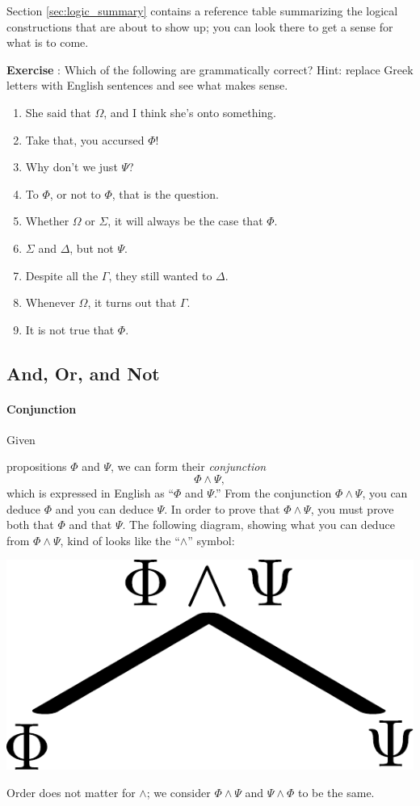 \documentclass[12pt]{article}
\newcommand{\AND}{\wedge}
\newcounter{exercise}
\def\putExerciseHeading{\refstepcounter{exercise} \textbf{Exercise \theexercise}}
\newcommand{\ex}[1]{ \putExerciseHeading: #1}
\def\pA{\Phi}
\def\pB{\Psi}
\def\pC{\Omega}
\def\pD{\Sigma}
\def\pE{\Gamma}
\def\pF{\Delta}
\begin{document}
Section \ref{sec:logic_summary}
contains a reference table summarizing the logical constructions that are about to show up;
you can look there to get a sense for what is to come.

\ex{
Which of the following are grammatically correct? Hint: replace Greek letters with English sentences and see what makes sense.
\begin{enumerate}
\item She said that $\pC$, and I think she's onto something.
\item Take that, you accursed $\pA$!
\item Why don't we just $\pB$?
\item To $\pA$, or not to $\pA$, that is the question.
\item Whether $\pC$ or $\pD$, it will always be the case that $\pA$.
\item $\pD$ and $\pF$, but not $\pB$.
\item Despite all the $\pE$, they still wanted to $\pF$.
\item Whenever $\pC$, it turns out that $\pE$.
\item It is not true that $\pA$.
\end{enumerate}
}



\subsection{And, Or, and Not}

\paragraph{Conjunction}
\hypertarget{hl:AND}{Given} propositions $\pA$ and $\pB$, we can form their \emph{conjunction}
$$
\pA \AND \pB,
$$
which is expressed in English as ``$\pA$ and $\pB$.''
\hypertarget{hl:ANDUSE}{From} the conjunction $\pA\AND\pB$, you can deduce $\pA$ and you can deduce $\pB$.
\hypertarget{hl:ANDPV}{In} order to prove that $\pA\AND\pB$, you must prove both that $\pA$ and that $\pB$.
The following diagram, showing what you can deduce from $\pA\AND\pB$, kind of looks like the ``$\AND$'' symbol:
\begin{center}\includegraphics[scale=0.5]{andDiagram.pdf}\end{center}
Order does not matter for $\AND$; we consider $\pA\AND\pB$ and $\pB\AND\pA$ to be the same.
\end{document}
